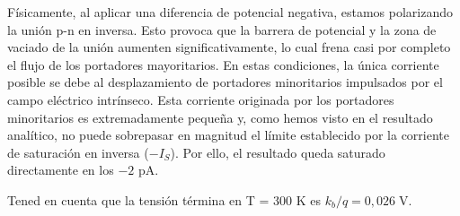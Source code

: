 \documentclass[11pt, a4paper]{article}
\newenvironment{problem}[1][Cuestión]{
	\vspace{0.5cm}
	\noindent{\Large\bfseries #1} \par\vspace{0.5cm}
}{
	\vspace{0.5cm}
}
\begin{document}
\begin{problem}[Cuestión 8]
\begin{enumerate}[label=\alph*)]
{					Físicamente, al aplicar una diferencia de potencial negativa, estamos polarizando la unión p-n en inversa. Esto provoca que la barrera de potencial y la zona de vaciado de la unión aumenten significativamente, lo cual frena casi por completo el flujo de los portadores mayoritarios. En estas condiciones, la única corriente posible se debe al desplazamiento de portadores minoritarios impulsados por el campo eléctrico intrínseco. Esta corriente originada por los portadores minoritarios es extremadamente pequeña y, como hemos visto en el resultado analítico, no puede sobrepasar en magnitud el límite establecido por la corriente de saturación en inversa ($-I_S$). Por ello, el resultado queda saturado directamente en los $-2 \text{ pA}$.
				}
		\end{enumerate}

		Tened en cuenta que la tensión términa en T = 300 K es $k_b / q = 0,026 \; \text{V}.$
	\end{problem}
\end{document}
